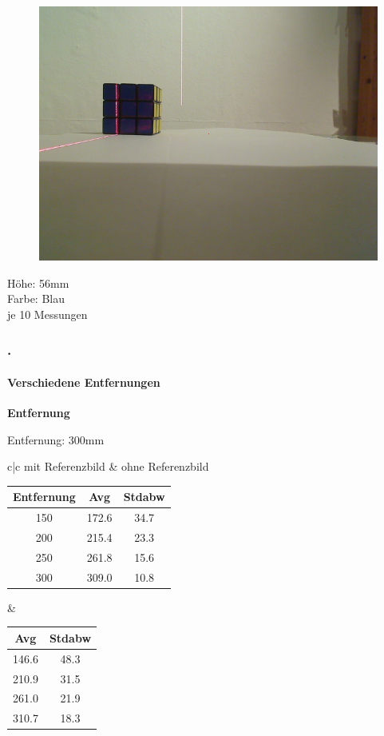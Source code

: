 \documentclass[xcolor=dvipsnames]{beamer}
\def\frametitlesec{\frametitle{\arabic{section}.\hspace{0.5ex}\insertsection}}
\def\framesubtitles#1{\framesubtitle{\hspace{3.5ex}#1}}
\begin{document}
\begin{frame}
\begin{figure}
\begin{minipage}{0.32\linewidth}
		\end{minipage}
		\hfill
		\begin{minipage}{0.32\linewidth}
			\includegraphics[width=\linewidth]{includes/test_dist_3}
		\end{minipage}
	\end{figure}

	Höhe: 56mm\\
	Farbe: Blau\\
	je 10 Messungen
	
\end{frame}


\begin{frame}
	\frametitlesec
	\framesubtitles{Verschiedene Entfernungen}

	\textbf{Entfernung}

	Entfernung: 300mm
	\vfill

	\begin{tabular}{c|c}
		mit Referenzbild & ohne Referenzbild\\
		\begin{tabular}{c|c|c}
			Entfernung & Avg & Stdabw\\ \hline
			150 &      172.6 & 34.7\\
			200 &      215.4 & 23.3\\
			250 &      261.8 & 15.6\\
			300 &      309.0 & 10.8
		\end{tabular} &

		\begin{tabular}{c|c}
			Avg   & Stdabw\\ \hline
			146.6 & 48.3\\
			210.9 & 31.5\\
			261.0 & 21.9\\
			310.7 & 18.3
		\end{tabular}
	\end{tabular}

\end{frame}
\end{document}

